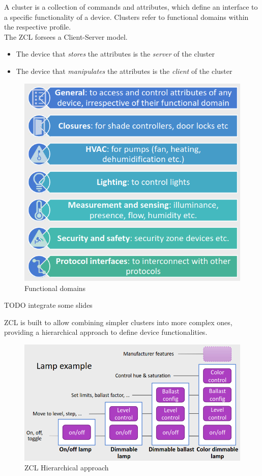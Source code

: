 A cluster is a collection of commands and attributes, which define an
interface to a specific functionality of a device.
Clusters refer to functional domains within the respective profile.\\
The ZCL forsees a Client-Server model.
\begin{itemize}
   \item The device that \textit{stores} the attributes is the \textit{server} of the cluster
   \item The device that \textit{manipulates} the attributes is the \textit{client} of the cluster
\end{itemize}
\begin{figure}[htbp]
   \centering
   \includegraphics{images/zigbee_functionaldomains.png}
   \caption{Functional domains}
   \label{fig:zigbee_functionaldomains}
\end{figure}

TODO integrate some slides

ZCL is built to allow combining simpler clusters into more complex ones, providing a hierarchical approach to define device functionalities.

\begin{figure}[htbp]
   \centering
   \includegraphics{images/zigbee_zclcombining.png}
   \caption{ZCL Hierarchical approach}
   \label{fig:zigbee_zclcombining}
\end{figure}

